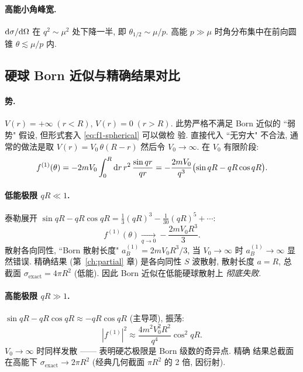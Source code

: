 \paragraph{高能小角峰宽.}
$\mathrm{d}\sigma/\mathrm{d}\Omega$ 在 $q^{2}\sim\mu^{2}$ 处下降一半, 即
$\theta_{1/2}\sim\mu/p$. 高能 $p\gg\mu$ 时角分布集中在前向圆锥
$\theta\lesssim\mu/p$ 内.

\subsection{硬球 Born 近似与精确结果对比}

\paragraph{势.} $V(r)=+\infty\;(r<R)$, $V(r)=0\;(r>R)$. 此势严格不满足
Born 近似的 ``弱势" 假设, 但形式套入 \eqref{eq:f1-spherical} 可以做检
验. 直接代入 ``无穷大" 不合法, 通常的做法是取
$V(r)=V_{0}\,\theta(R-r)$ 然后令 $V_{0}\to\infty$. 在 $V_{0}$ 有限阶段:
\begin{equation}
f^{(1)}(\theta)=-2mV_{0}\int_{0}^{R}\mathrm{d} r\,r^{2}\,\frac{\sin qr}{qr}
=-\frac{2mV_{0}}{q^{3}}\bigl(\sin qR-qR\cos qR\bigr).
\label{eq:born-ex-hardsph-f}
\end{equation}

\paragraph{低能极限 $qR\ll 1$.}
泰勒展开 $\sin qR-qR\cos qR=\frac{1}{3}(qR)^{3}-\frac{1}{30}(qR)^{5}+\cdots$:
\begin{equation}
f^{(1)}(\theta)\xrightarrow[q\to 0]{}-\frac{2mV_{0}R^{3}}{3}.
\label{eq:born-ex-hardsph-low}
\end{equation}
散射各向同性, ``Born 散射长度" $a^{(1)}_{B}=2mV_{0}R^{3}/3$, 当
$V_{0}\to\infty$ 时 $a^{(1)}_{B}\to\infty$ 显然错误. 精确结果 (第~\ref{ch:partial} 章)
是各向同性 $S$ 波散射, 散射长度 $a=R$, 总截面
$\sigma_{\text{exact}}=4\pi R^{2}$ (低能). 因此 Born 近似在低能硬球散射上
\emph{彻底失败}.

\paragraph{高能极限 $qR\gg 1$.}
$\sin qR-qR\cos qR\approx -qR\cos qR$ (主导项), 振荡:
\begin{equation}
|f^{(1)}|^{2}\approx\frac{4m^{2}V_{0}^{2}R^{2}}{q^{4}}\cos^{2}qR.
\label{eq:born-ex-hardsph-high}
\end{equation}
$V_{0}\to\infty$ 时同样发散 —— 表明硬芯极限是 Born 级数的奇异点. 精确
结果总截面在高能下 $\sigma_{\text{exact}}\to 2\pi R^{2}$ (经典几何截面 $\pi R^{2}$
的 2 倍, 因衍射).

